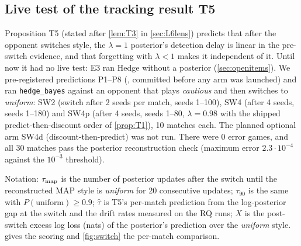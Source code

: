 \documentclass[10pt]{article}
\theoremstyle{plain}
\theoremstyle{definition}
\theoremstyle{remark}
\newcommand{\src}[1]{\path{#1}}
\begin{document}
\subsection{Live test of the tracking result T5}\label{sec:bench-switch}

Proposition T5 (stated after \cref{lem:T3} in \cref{sec:L6lens}) predicts that after the opponent switches style, the
$\lambda=1$ posterior's detection delay is linear in the pre-switch evidence, and that forgetting with $\lambda<1$
makes it independent of it. Until now it had no live test: E3 ran Hedge without a posterior (\cref{sec:openitems}). We
pre-registered predictions P1--P8 (\src{research/prereg_style_switch.md}, committed before any arm was launched) and
ran \texttt{hedge\_bayes} against an opponent that plays \emph{cautious} and then switches to \emph{uniform}: SW2 (switch after
2 seeds per match, seeds 1--100), SW4 (after 4 seeds, seeds 1--180) and SW4p (after 4 seeds, seeds 1--80, $\lambda=0.98$
with the shipped predict-then-discount order of \cref{prop:T1}), 10 matches each. The planned optional arm SW4d
(discount-then-predict) was not run. There were 0 error games, and all 30 matches pass the posterior reconstruction check
(maximum error $2.3\cdot10^{-4}$ against the $10^{-3}$ threshold).

Notation: $\tau_{\rm map}$ is the number of posterior updates after the switch until the reconstructed MAP style is
\emph{uniform} for 20 consecutive updates; $\tau_{90}$ is the same with $P(\text{uniform})\ge0.9$; $\hat\tau$ is T5's
per-match prediction from the log-posterior gap at the switch and the drift rates measured on the RQ runs; $X$ is the
post-switch excess log loss (nats) of the posterior's prediction over the \emph{uniform} style.
 gives the scoring and \cref{fig:switch} the per-match comparison.
\end{document}

